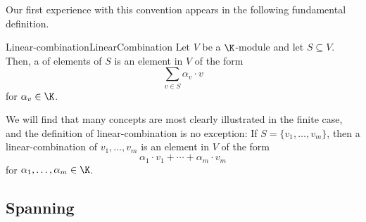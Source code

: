 Our first experience with this convention appears in the following fundamental definition.
\begin{dfn}{Linear-combination}{LinearCombination}
	Let $V$ be a $\K$-module and let $S\subseteq V$.  Then, a  of elements of $S$ is an element in $V$ of the form
	\begin{equation}
		\sum _{v\in S}\alpha _v\cdot v
	\end{equation}
	for $\alpha _v\in \K$.
	\begin{rmk}
		We will find that many concepts are most clearly illustrated in the finite case, and the definition of linear-combination is no exception:  If $S=\{ v_1,\ldots ,v_m\}$, then a linear-combination of $v_1,\ldots ,v_m$ is an element in $V$ of the form
		\begin{equation}
			\alpha _1\cdot v_1+\cdots +\alpha _m\cdot v_m
		\end{equation}
		for $\alpha _1,\ldots ,\alpha _m\in \K$.
	\end{rmk}
\end{dfn}

\subsection{Spanning}

